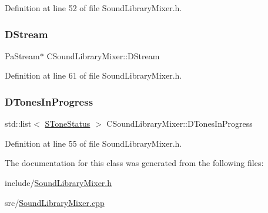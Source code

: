 Definition at line 52 of file Sound\+Library\+Mixer.\+h.

\hypertarget{classCSoundLibraryMixer_ad992cd6202130db3a45ca695eca34625}{}\label{classCSoundLibraryMixer_ad992cd6202130db3a45ca695eca34625} 
\subsubsection{\texorpdfstring{D\+Stream}{DStream}}
{\footnotesize\ttfamily Pa\+Stream$\ast$ C\+Sound\+Library\+Mixer\+::\+D\+Stream\hspace{0.3cm}{\ttfamily [protected]}}



Definition at line 61 of file Sound\+Library\+Mixer.\+h.

\hypertarget{classCSoundLibraryMixer_a39bb9c811d842a282b6b7058ac7dfe1c}{}\label{classCSoundLibraryMixer_a39bb9c811d842a282b6b7058ac7dfe1c} 
\subsubsection{\texorpdfstring{D\+Tones\+In\+Progress}{DTonesInProgress}}
{\footnotesize\ttfamily std\+::list$<$ \hyperlink{structCSoundLibraryMixer_1_1SToneStatus}{S\+Tone\+Status} $>$ C\+Sound\+Library\+Mixer\+::\+D\+Tones\+In\+Progress\hspace{0.3cm}{\ttfamily [protected]}}



Definition at line 55 of file Sound\+Library\+Mixer.\+h.



The documentation for this class was generated from the following files\+:\begin{DoxyCompactItemize}
\item 
include/\hyperlink{SoundLibraryMixer_8h}{Sound\+Library\+Mixer.\+h}\item 
src/\hyperlink{SoundLibraryMixer_8cpp}{Sound\+Library\+Mixer.\+cpp}\end{DoxyCompactItemize}
